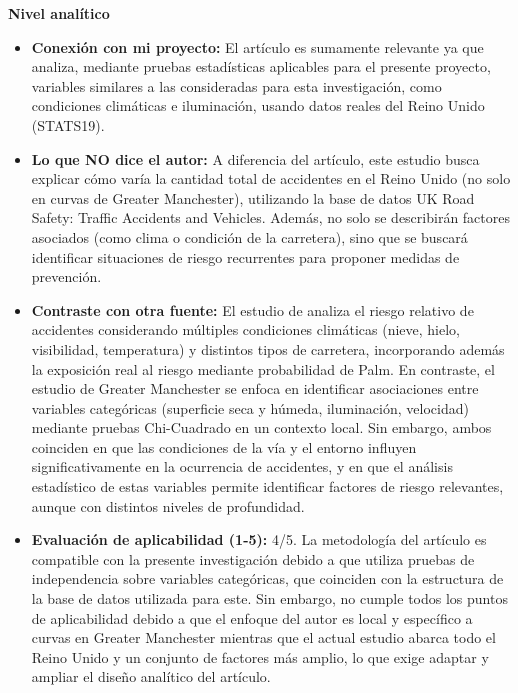 \documentclass[12pt]{article}
\begin{document}
\textbf{Nivel analítico}

\begin{itemize}
    \item \textbf{Conexión con mi proyecto:} El artículo es sumamente relevante ya que analiza, mediante pruebas estadísticas 
    aplicables para el presente proyecto, variables similares a las consideradas para esta investigación, como condiciones 
    climáticas e iluminación, usando datos reales del Reino Unido (STATS19). 
    
	\item \textbf{Lo que NO dice el autor:} A diferencia del artículo, este estudio busca explicar cómo varía la cantidad
    total de accidentes en el Reino Unido (no solo en curvas de Greater Manchester), utilizando la base de datos UK Road 
    Safety: Traffic Accidents and Vehicles. Además, no solo se describirán factores asociados (como clima o condición de la 
    carretera), sino que se buscará identificar situaciones de riesgo recurrentes para proponer medidas de prevención. 
    
	\item \textbf{Contraste con otra fuente:} El estudio de \textcite{MALIN2019} analiza el riesgo relativo de accidentes considerando múltiples condiciones climáticas (nieve, 
    hielo, visibilidad, temperatura) y distintos tipos de carretera, incorporando además la exposición real al riesgo mediante 
    probabilidad de Palm. En contraste, el estudio de Greater Manchester se enfoca en identificar asociaciones entre variables
    categóricas (superficie seca y húmeda, iluminación, velocidad) mediante pruebas Chi-Cuadrado en un contexto local. 
    Sin embargo, ambos coinciden en que las condiciones de la vía y el entorno influyen significativamente en la ocurrencia 
    de accidentes, y en que el análisis estadístico de estas variables permite identificar factores de riesgo relevantes, 
    aunque con distintos niveles de profundidad.  
    
	\item \textbf{Evaluación de aplicabilidad (1-5):} 4/5. La metodología del artículo es compatible con la presente investigación 
    debido a que utiliza pruebas de independencia sobre variables categóricas, que coinciden con la estructura de la base 
    de datos utilizada para este. Sin embargo, no cumple todos los puntos de aplicabilidad debido a que el 
    enfoque del autor es local y específico a curvas en Greater Manchester mientras que el actual estudio abarca todo el 
    Reino Unido y un conjunto de factores más amplio, lo que exige adaptar y ampliar el diseño analítico del artículo.
    

\end{itemize}
\end{document}
